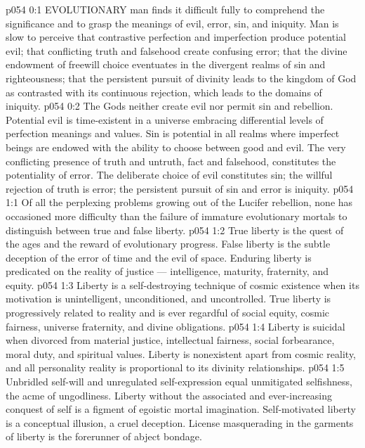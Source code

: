 \vs p054 0:1 EVOLUTIONARY man finds it difficult fully to comprehend the significance and to grasp the meanings of evil, error, sin, and iniquity. Man is slow to perceive that contrastive perfection and imperfection produce potential evil; that conflicting truth and falsehood create confusing error; that the divine endowment of freewill choice eventuates in the divergent realms of sin and righteousness; that the persistent pursuit of divinity leads to the kingdom of God as contrasted with its continuous rejection, which leads to the domains of iniquity.
\vs p054 0:2 The Gods neither create evil nor permit sin and rebellion. Potential evil is time\hyp{}existent in a universe embracing differential levels of perfection meanings and values. Sin is potential in all realms where imperfect beings are endowed with the ability to choose between good and evil. The very conflicting presence of truth and untruth, fact and falsehood, constitutes the potentiality of error. The deliberate choice of evil constitutes sin; the willful rejection of truth is error; the persistent pursuit of sin and error is iniquity.
\vs p054 1:1 Of all the perplexing problems growing out of the Lucifer rebellion, none has occasioned more difficulty than the failure of immature evolutionary mortals to distinguish between true and false liberty.
\vs p054 1:2 True liberty is the quest of the ages and the reward of evolutionary progress. False liberty is the subtle deception of the error of time and the evil of space. Enduring liberty is predicated on the reality of justice --- intelligence, maturity, fraternity, and equity.
\vs p054 1:3 Liberty is a self\hyp{}destroying technique of cosmic existence when its motivation is unintelligent, unconditioned, and uncontrolled. True liberty is progressively related to reality and is ever regardful of social equity, cosmic fairness, universe fraternity, and divine obligations.
\vs p054 1:4 Liberty is suicidal when divorced from material justice, intellectual fairness, social forbearance, moral duty, and spiritual values. Liberty is nonexistent apart from cosmic reality, and all personality reality is proportional to its divinity relationships.
\vs p054 1:5 Unbridled self\hyp{}will and unregulated self\hyp{}expression equal unmitigated selfishness, the acme of ungodliness. Liberty without the associated and ever\hyp{}increasing conquest of self is a figment of egoistic mortal imagination. Self\hyp{}motivated liberty is a conceptual illusion, a cruel deception. License masquerading in the garments of liberty is the forerunner of abject bondage.
